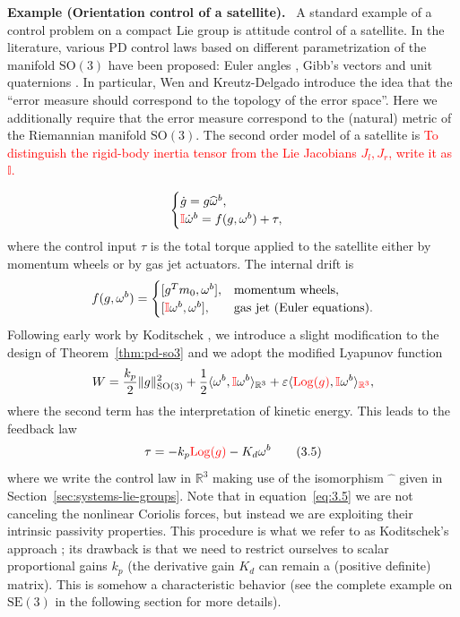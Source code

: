 \documentclass[11pt]{article}
\newcommand{\rev}[1]{\textcolor{red}{#1}}
\newcommand{\Log}{\operatorname{Log}}
\newcommand{\SO}{\mathrm{SO}}
\newcommand{\SE}{\mathrm{SE}}
\newcommand{\R}{\mathbb R}
\newcommand{\eps}{\varepsilon}
\newcounter{paperexample}
\renewcommand{\thepaperexample}{\arabic{paperexample}}
\newcommand{\paperexample}[2]{\refstepcounter{paperexample}\par\medskip\noindent\textbf{Example \thepaperexample#1.}\label{#2}\ }
\begin{document}
\paperexample{ (Orientation control of a satellite)}{ex:satellite-orientation} A standard example of a control problem on a compact Lie group is attitude control of a satellite. In the literature, various PD control laws based on different parametrization of the manifold $\SO(3)$ have been proposed: Euler angles \cite{30}, Gibb's vectors \cite{31} and unit quaternions \cite{34}. In particular, Wen and Kreutz-Delgado \cite{34} introduce the idea that the ``error measure should correspond to the topology of the error space''. Here we additionally require that the error measure correspond to the (natural) metric of the Riemannian manifold $\SO(3)$. The second order model of a satellite is
\rev{To distinguish the rigid-body inertia tensor from the Lie Jacobians $J_l,J_r$, write it as $\mathbb I$.}\par
\begin{equation*}
\begin{cases}
\dot g=g\widehat\omega^b,\\
\rev{\mathbb I}\dot\omega^b=f(g,\omega^b)+\tau,
\end{cases}
\end{equation*}
where the control input $\tau$ is the total torque applied to the satellite either by momentum wheels or by gas jet actuators. The internal drift is
\begin{equation*}
f(g,\omega^b)=
\begin{cases}
[g^T m_0,\omega^b],&\text{momentum wheels},\\
[\rev{\mathbb I}\omega^b,\omega^b],&\text{gas jet (Euler equations)}.
\end{cases}
\end{equation*}
Following early work by Koditschek \cite{19}, we introduce a slight modification to the design of Theorem~\ref{thm:pd-so3} and we adopt the modified Lyapunov function
\begin{equation*}
W=\frac{k_p}{2}\|g\|_{\SO(3)}^2+\frac12\langle\omega^b,\rev{\mathbb I}\omega^b\rangle_{\R^3}+\eps\langle\rev{\Log(g)},\rev{\mathbb I}\omega^b\rangle_{\rev{\R^3}},
\end{equation*}
where the second term has the interpretation of kinetic energy. This leads to the feedback law
\begin{equation*}
\tau=-k_p\rev{\Log(g)}-K_d\omega^b\tag{3.5}\label{eq:3.5}
\end{equation*}
where we write the control law in $\R^3$ making use of the isomorphism $\widehat{\phantom{x}}$ given in Section~\ref{sec:systems-lie-groups}.
Note that in equation~\eqref{eq:3.5} we are not canceling the nonlinear Coriolis forces, but instead we are exploiting their intrinsic passivity properties. This procedure is what we refer to as Koditschek's approach \cite{19}; its drawback is that we need to restrict ourselves to scalar proportional gains $k_p$ (the derivative gain $K_d$ can remain a (positive definite) matrix). This is somehow a characteristic behavior (see the complete example on $\SE(3)$ in the following section for more details).
\end{document}
